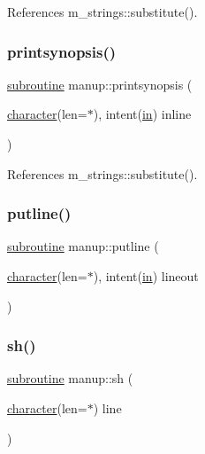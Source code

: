 References m\+\_\+strings\+::substitute().

\mbox{\label{manup_8f90_aabf73d1c2ef02028690008788b8a1f9d}} 
\subsubsection{\texorpdfstring{printsynopsis()}{printsynopsis()}}
{\footnotesize\ttfamily \hyperlink{M__stopwatch_83_8txt_acfbcff50169d691ff02d4a123ed70482}{subroutine} manup\+::printsynopsis (\begin{DoxyParamCaption}\item[{\hyperlink{option__stopwatch_83_8txt_abd4b21fbbd175834027b5224bfe97e66}{character}(len=$\ast$), intent(\hyperlink{M__journal_83_8txt_afce72651d1eed785a2132bee863b2f38}{in})}]{inline }\end{DoxyParamCaption})\hspace{0.3cm}{\ttfamily [private]}}



References m\+\_\+strings\+::substitute().

\mbox{\label{manup_8f90_a4b6c4dc9df113c44655bdf0f96ed6018}} 
\subsubsection{\texorpdfstring{putline()}{putline()}}
{\footnotesize\ttfamily \hyperlink{M__stopwatch_83_8txt_acfbcff50169d691ff02d4a123ed70482}{subroutine} manup\+::putline (\begin{DoxyParamCaption}\item[{\hyperlink{option__stopwatch_83_8txt_abd4b21fbbd175834027b5224bfe97e66}{character}(len=$\ast$), intent(\hyperlink{M__journal_83_8txt_afce72651d1eed785a2132bee863b2f38}{in})}]{lineout }\end{DoxyParamCaption})\hspace{0.3cm}{\ttfamily [private]}}

\mbox{\label{manup_8f90_ae720ba239fabc9a2eefd18acea10cc90}} 
\subsubsection{\texorpdfstring{sh()}{sh()}}
{\footnotesize\ttfamily \hyperlink{M__stopwatch_83_8txt_acfbcff50169d691ff02d4a123ed70482}{subroutine} manup\+::sh (\begin{DoxyParamCaption}\item[{\hyperlink{option__stopwatch_83_8txt_abd4b21fbbd175834027b5224bfe97e66}{character}(len=$\ast$)}]{line }\end{DoxyParamCaption})\hspace{0.3cm}{\ttfamily [private]}}

